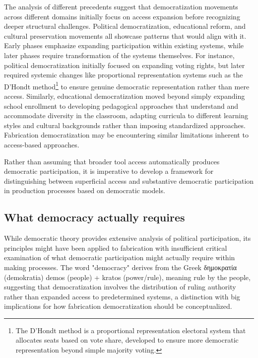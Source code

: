 The analysis of different precedents suggest that democratization movements across different domains initially focus on access expansion before recognizing deeper structural challenges. Political democratization, educational reform, and cultural preservation movements all showcase patterns that would align with it. Early phases emphasize expanding participation within existing systems, while later phases require transformation of the systems themselves. For instance, political democratization initially focused on expanding voting rights, but later required systemic changes like proportional representation systems such as the D'Hondt method\footnote{The D'Hondt method is a proportional representation electoral system that allocates seats based on vote share, developed to ensure more democratic representation beyond simple majority voting.} to ensure genuine democratic representation rather than mere access. Similarly, educational democratization moved beyond simply expanding school enrollment to developing pedagogical approaches that understand and accommodate diversity in the classroom, adapting curricula to different learning styles and cultural backgrounds rather than imposing standardized approaches. Fabrication democratization may be encountering similar limitations inherent to access-based approaches.

\vspace{0.5cm}

Rather than assuming that broader tool access automatically produces democratic participation, it is imperative to develop a framework for distinguishing between superficial access and substantive democratic participation in production processes based on democratic models.

\subsection{What democracy actually requires}

While democratic theory provides extensive analysis of political participation, its principles might have been applied to fabrication with insufficient critical examination of what democratic participation might actually require within making processes. The word "democracy" derives from the Greek {\greekfont δημοκρατία} (demokratia) demos (people) + kratos (power/rule), meaning rule by the people, suggesting that democratization involves the distribution of ruling authority rather than expanded access to predetermined systems, a distinction with big implications for how fabrication democratization should be conceptualized.

